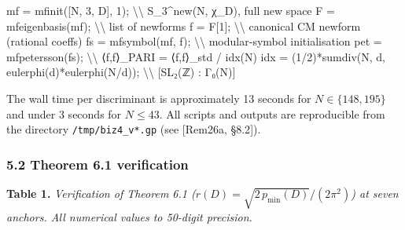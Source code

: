 \documentclass[
  11pt,
  a4paper,
]{amsart}
\newenvironment{Shaded}{}{}
\newcommand{\NormalTok}[1]{#1}
\begin{document}
\begin{Shaded}
\begin{Highlighting}[]
\NormalTok{mf  = mfinit([N, 3, D], 1);          \textbackslash{}\textbackslash{} S\_3\^{}new(N, χ\_D), full new space}
\NormalTok{F   = mfeigenbasis(mf);              \textbackslash{}\textbackslash{} list of newforms}
\NormalTok{f   = F[1];                          \textbackslash{}\textbackslash{} canonical CM newform (rational coeffs)}
\NormalTok{fs  = mfsymbol(mf, f);               \textbackslash{}\textbackslash{} modular{-}symbol initialisation}
\NormalTok{pet = mfpetersson(fs);               \textbackslash{}\textbackslash{} ⟨f,f⟩\_PARI = ⟨f,f⟩\_std / idx(N)}
\NormalTok{idx = (1/2)*sumdiv(N, d, eulerphi(d)*eulerphi(N/d));  \textbackslash{}\textbackslash{} [SL₂(ℤ) : Γ₀(N)]}
\end{Highlighting}
\end{Shaded}

The wall time per discriminant is approximately 13 seconds for \(N\in\{148, 195\}\) and under 3 seconds for \(N\le 43\). All scripts and outputs are reproducible from the directory \texttt{/tmp/biz4\_v*.gp} (see {[}Rem26a, §8.2{]}).

\hypertarget{theorem-6.1-verification}{%
\subsubsection{5.2 Theorem 6.1 verification}\label{theorem-6.1-verification}}

\textbf{Table 1.} \emph{Verification of Theorem 6.1 (\(r(D) = \sqrt{2\,p_{\min}(D)}/(2\pi^{2})\)) at seven anchors. All numerical values to 50-digit precision.}
\end{document}
